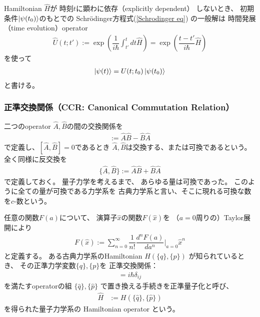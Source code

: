 Hamiltonian $\hat{H}$が
時刻$t$に顕わに依存（explicitly dependent）
しないとき、
初期条件$\ket{ \psi(t_0) }$のもとでの
Schr\"odinger方程式(\ref{Schrodinger eq})
の一般解は
時間発展（time evolution）operator
\begin{align}
    \hat{U}(t;t')
    :=
    \exp\left(
        \dfrac{1}{i \hbar}
        \int_{t'}^{t}dt
        \hat{H}
    \right)
    =
    \exp\left(
        \dfrac{t - t'}{i \hbar}
        \hat{H}
    \right)
\label{time evolution operator}
\end{align}
を使って
\begin{align}
    \ket{ \psi(t) }
    =
    U (t;t_0)
    \ket{ \psi(t_0) }
\label{time dependent solution for Schrodinger eq}
\end{align}
と書ける。

\subsubsection{正準交換関係（CCR: Canonical Commutation Relation）}
\label{subsubsec: CCR}

二つのoperator $\hat{A}, \hat{B}$の間の交換関係を
\begin{align}
    [\hat{A}, \hat{B}] := \hat{A} \hat{B} - \hat{B} \hat{A}
\end{align}
で定義し、$[\hat{A}, \hat{B}] = 0$であるとき
$\hat{A}, \hat{B}$は交換する、または可換であるという。
全く同様に反交換を
\begin{align}
    \{\hat{A}, \hat{B}\} := \hat{A} \hat{B} + \hat{B} \hat{A}
\end{align}
で定義しておく。
量子力学を考えるまで、
あらゆる量は可換であった。
このように全ての量が可換である力学系を
古典力学系と言い、そこに現れる可換な数を$c$-数という。

任意の関数$F(a)$について、
演算子$\hat{x}$の関数$F(\hat{x})$を
（$a=0$周りの）Taylor展開により
\begin{align}
    F(\hat{x}) := \sum_{n=0}^\infty
        \dfrac{1}{n!}
        \dfrac{d^nF(a)}{da^n}\bigg|_{a=0}
        \hat{x}^n
\label{function of operator}
\end{align}
と定義する。
ある古典力学系のHamiltonian $H(\{q\},\{p\})$
が知られているとき、
その正準力学変数$\{q\},\{p\}$を
正準交換関係：
\begin{align}
    [ \hat{q}_i , \hat{p}_j ] = i\hbar \delta_{ij}
\end{align}
を満たすoperatorの組
$ \{\hat{q}\} , \{\hat{p}\} $
で置き換える手続きを正準量子化と呼び、
\begin{align}
    \hat{H}
    &:=
    H(\{\hat{q}\} , \{\hat{p}\})
\end{align}
を得られた量子力学系の
Hamiltonian operator
という。

